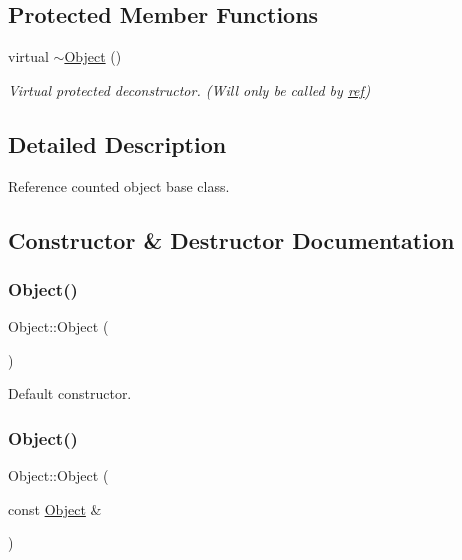 \subsection*{Protected Member Functions}
\begin{DoxyCompactItemize}
\item 
virtual \mbox{\hyperlink{class_object_aa3e791419d84c4c346ef9499513b8e00}{$\sim$\+Object}} ()
\begin{DoxyCompactList}\small\item\em Virtual protected deconstructor. (Will only be called by \mbox{\hyperlink{classref}{ref}}) \end{DoxyCompactList}\end{DoxyCompactItemize}


\subsection{Detailed Description}
Reference counted object base class. 

\subsection{Constructor \& Destructor Documentation}
\mbox{\label{class_object_a40860402e64d8008fb42329df7097cdb}} 
\subsubsection{\texorpdfstring{Object()}{Object()}\hspace{0.1cm}{\footnotesize\ttfamily [1/2]}}
{\footnotesize\ttfamily Object\+::\+Object (\begin{DoxyParamCaption}{ }\end{DoxyParamCaption})\hspace{0.3cm}{\ttfamily [inline]}}



Default constructor. 

\mbox{\label{class_object_af3b5cd7a9a24ddde484344200cf83281}} 
\subsubsection{\texorpdfstring{Object()}{Object()}\hspace{0.1cm}{\footnotesize\ttfamily [2/2]}}
{\footnotesize\ttfamily Object\+::\+Object (\begin{DoxyParamCaption}\item[{const \mbox{\hyperlink{class_object}{Object}} \&}]{ }\end{DoxyParamCaption})\hspace{0.3cm}{\ttfamily [inline]}}



